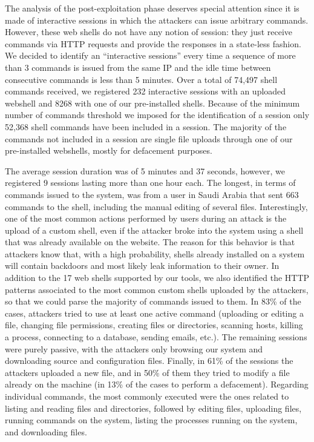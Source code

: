 The analysis of the post-exploitation phase deserves special attention since it is made of interactive sessions in which the attackers can issue arbitrary commands. However, these web shells do not have any notion of session: they just receive commands via HTTP requests and provide the responses in a state-less fashion. We decided to identify an ``interactive sessions'' every time a sequence of more than 3 commands is issued from the same IP and the idle time between consecutive commands is less than 5 minutes.
Over a total of 74,497 shell commands received, we registered 232 interactive sessions with an uploaded webshell and 8268 with one of our pre-installed shells. Because of the minimum number of commands threshold we imposed for the identification of a session only 52,368 shell commands have been included in a session. The majority of the commands not included in a session are single file uploads through one of our pre-installed webshells, mostly for defacement purposes.

The average session duration was of 5 minutes and 37 seconds, however, we registered 9 sessions lasting more than one hour each. The longest, in terms of commands issued to the system, was from a user in Saudi Arabia that sent 663 commands to the shell, including the manual editing of several files. Interestingly, one of the most common actions performed by users during an attack is the upload of a custom shell, even if the attacker broke into the system using a shell that was already available on the website. The reason for this behavior is that attackers know that, with a high probability, shells already installed on a system will contain backdoors and most likely leak information to their owner. In addition to the 17 web shells supported by our tools, we also identified the HTTP patterns associated to the most common custom shells uploaded by the attackers, so that we could parse the majority of commands issued to them.
In 83\% of the cases, attackers tried to use at least one active command (uploading or editing a file, changing file permissions, creating files or directories, scanning hosts, killing a process, connecting to a database, sending emails, etc.). The remaining sessions were purely passive, with the attackers only browsing our system and downloading source and configuration files.
Finally, in 61\% of the sessions the attackers uploaded a new file, and in 50\% of them they tried to modify a file already on the machine (in 13\% of the cases to perform a defacement). Regarding individual commands, the most commonly executed were the ones related to listing and reading files and directories, followed by editing files, uploading files, running commands on the system, listing the processes running on the system, and downloading files.

